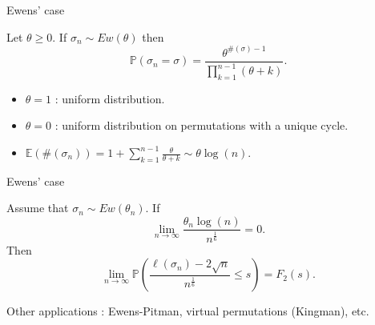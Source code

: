 \documentclass[english]{beamer}
\begin{document}
\begin{frame}{Ewens' case}
\begin{definition}
Let $\theta\geq 0$. If $\sigma_n\sim Ew(\theta)$ then
\begin{equation*}
\mathbb{P}(\sigma_n=\sigma)=\frac{\theta^{\#(\sigma)-1}}{\prod_{k=1}^{n-1}(\theta+k)}.\end{equation*}
\end{definition}
\vspace{5 mm}

\begin{itemize}
\item $\theta=1$ :  uniform distribution.
\item $\theta=0$ : uniform distribution on permutations with a unique cycle. 
\item $\mathbb{E}(\#(\sigma_n))= 1+\sum_{k=1}^{n-1} \frac{\theta}{\theta+k}\sim \theta \log(n).$
\end{itemize}
\end{frame}
\begin{frame}{Ewens' case}
\begin{corollary} \label{2.1}
Assume that $\sigma_n\sim Ew(\theta_n)$. If
\begin{equation}\tag{H'2}\label{ewcond}
\lim_{n\to \infty} \frac{\theta_n \log(n)  }{n^\frac 1 6}=0.
\end{equation}
Then 
\begin{equation}  \tag{TW}
\lim_{n\to \infty} \mathbb{P}\left(\frac{\ell(\sigma_n)-2\sqrt{n}}{n^\frac 16}\leq s\right)=F_2(s).
\end{equation}
\end{corollary}
\vspace{10 mm }
Other applications : Ewens-Pitman, virtual permutations (Kingman), etc.
\end{frame}
\end{document}
